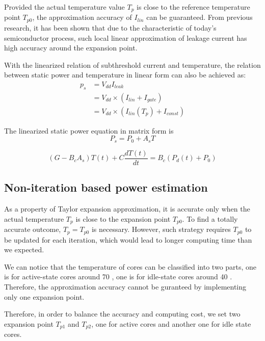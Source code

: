 Provided the actual temperature value $T_{p}$ is close to the reference temperature point $T_{p0}$, the approximation accuracy of $I_{lin}$ can be guaranteed. From previous research, it has been shown that due to the characteristic of today's semiconductor process, such local linear approximation of leakage current has high accuracy around the expansion point.

With the linearized relation of subthreshold current and temperature, the relation between static power and temperature in linear form can also be achieved as:
\begin{equation}\label{linear_static}
\begin{split}
p_{s} &= V_{dd}I_{leak}\\
&= V_{dd} \times (I_{lin}+I_{gate})\\
&= V_{dd} \times (I_{lin}(T_{p})+I_{const})
\end{split}
\end{equation}


The linearized static power equation in matrix form is
\begin{equation}\label{linear_static_matrix}
P_{s} = P_{0}+A_{s}T
\end{equation}

\begin{equation}\label{gt=bp}
(G - B_{c}A_{s})T(t) + C\frac{dT(t)}{dt} = B_{c}(P_{d}(t) + P_{0})
\end{equation}

\subsection{Non-iteration based power estimation}
As a property of Taylor expansion approximation, it is accurate only when the actual temperature $T_{p}$ is close to the expansion point $T_{p0}$. To find a totally accurate outcome, $T_{p} = T_{p0}$ is necessary. However, such strategy requires $T_{p0}$ to be updated for each iteration, which would lead to longer computing time than we expected. 

We can notice that the temperature of cores can be classified into two parts, one is for active-state cores around 70 \degreeCelsius, one is for idle-state cores around 40 \degreeCelsius. Therefore, the approximation accuracy cannot be guranteed by implementing only one expansion point. 

Therefore, in order to balance the accuracy and computing cost, we set two expansion point $T_{p1}$ and $T_{p2}$, one for active cores and another one for idle state cores.


